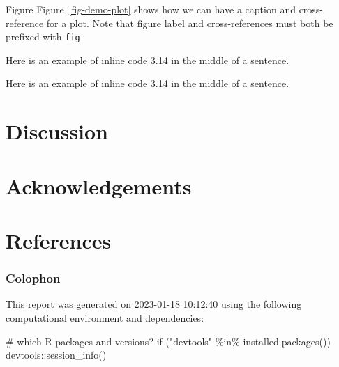 \documentclass[
  super,
  preprint,
  3p]{elsarticle}
\newenvironment{Shaded}{\begin{snugshade}}{\end{snugshade}}
\newcommand{\CommentTok}[1]{\textcolor[rgb]{0.37,0.37,0.37}{#1}}
\newcommand{\ControlFlowTok}[1]{\textcolor[rgb]{0.00,0.23,0.31}{#1}}
\newcommand{\FunctionTok}[1]{\textcolor[rgb]{0.28,0.35,0.67}{#1}}
\newcommand{\NormalTok}[1]{\textcolor[rgb]{0.00,0.23,0.31}{#1}}
\newcommand{\SpecialCharTok}[1]{\textcolor[rgb]{0.37,0.37,0.37}{#1}}
\newcommand{\StringTok}[1]{\textcolor[rgb]{0.13,0.47,0.30}{#1}}
\newlength{\cslhangindent}
\newlength{\cslentryspacingunit} %
\newenvironment{CSLReferences}[2] %
 {%
  \setlength{\parindent}{0pt}
  \ifodd #1
  \let\oldpar\par
  \def\par{\hangindent=\cslhangindent\oldpar}
  \fi
  \setlength{\parskip}{#2\cslentryspacingunit}
 }%
 {}
\begin{document}
Figure Figure~\ref{fig-demo-plot} shows how we can have a caption and
cross-reference for a plot. Note that figure label and cross-references
must both be prefixed with \texttt{fig-}

Here is an example of inline code 3.14 in the middle of a sentence.

Here is an example of inline code 3.14 in the middle of a sentence.

\hypertarget{discussion-1}{%
\section{Discussion}\label{discussion-1}}

\hypertarget{acknowledgements}{%
\section{Acknowledgements}\label{acknowledgements}}

\hypertarget{references}{%
\section{References}\label{references}}

\hypertarget{refs}{}
\begin{CSLReferences}{0}{0}
\end{CSLReferences}

\newpage

\hypertarget{refs}{}
\begin{CSLReferences}{0}{0}
\end{CSLReferences}

\hypertarget{colophon}{%
\subsubsection{Colophon}\label{colophon}}

This report was generated on 2023-01-18 10:12:40 using the following
computational environment and dependencies:

\begin{Shaded}
\begin{Highlighting}[]
\CommentTok{\# which R packages and versions?}
\ControlFlowTok{if}\NormalTok{ (}\StringTok{"devtools"} \SpecialCharTok{\%in\%} \FunctionTok{installed.packages}\NormalTok{()) devtools}\SpecialCharTok{::}\FunctionTok{session\_info}\NormalTok{()}
\end{Highlighting}
\end{Shaded}
\end{document}
